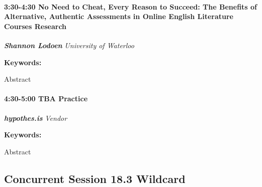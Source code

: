 \documentclass[
]{book}
\begin{document}
\begin{session}
\hypertarget{no-need-to-cheat-every-reason-to-succeed-the-benefits-of-alternative-authentic-assessments-in-online-english-literature-courses-research}{%
\paragraph*{\texorpdfstring{3:30-4:30 \textbar{} \textbf{No Need to
Cheat, Every Reason to Succeed: The Benefits of Alternative, Authentic
Assessments in Online English Literature Courses} \textbar{}
Research}{3:30-4:30 \textbar{} No Need to Cheat, Every Reason to Succeed: The Benefits of Alternative, Authentic Assessments in Online English Literature Courses \textbar{} Research}}\label{no-need-to-cheat-every-reason-to-succeed-the-benefits-of-alternative-authentic-assessments-in-online-english-literature-courses-research}}

\textbf{\emph{Shannon Lodoen}} \textbar{} \emph{University of Waterloo}

\textbf{Keywords:}

Abstract
\end{session}

\begin{vendor}
\hypertarget{tba-practice}{%
\paragraph*{\texorpdfstring{4:30-5:00 \textbar{} \textbf{TBA} \textbar{}
Practice}{4:30-5:00 \textbar{} TBA \textbar{} Practice}}\label{tba-practice}}

\textbf{\emph{hypothes.is}} \textbar{} \emph{Vendor}

\textbf{Keywords:}

Abstract
\end{vendor}

\hypertarget{concurrent-session-18.3-wildcard}{%
\subsection*{Concurrent Session 18.3 \textbar{} Wildcard}\label{concurrent-session-18.3-wildcard}}
\end{document}
